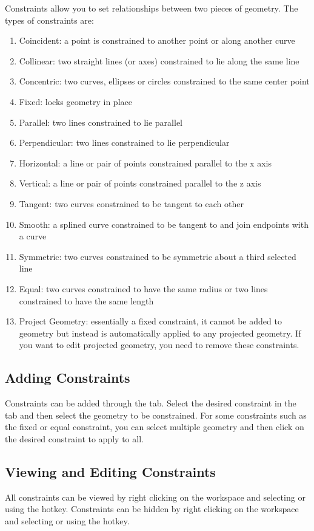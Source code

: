\cbstart

Constraints allow you to set relationships between two pieces of geometry. The types of constraints are:

\begin{enumerate}
\item Coincident: a point is constrained to another point or along another curve
\item Collinear: two straight lines (or axes) constrained to lie along the same line
\item Concentric: two curves, ellipses or circles constrained to the same center point
\item Fixed: locks geometry in place
\item Parallel: two lines constrained to lie parallel
\item Perpendicular: two lines constrained to lie perpendicular
\item Horizontal: a line or pair of points constrained parallel to the x axis
\item Vertical: a line or pair of points constrained parallel to the z axis
\item Tangent: two curves constrained to be tangent to each other
\item Smooth: a splined curve constrained to be tangent to and join endpoints with a curve
\item Symmetric: two curves constrained to be symmetric about a third selected line
\item Equal: two curves constrained to have the same radius or two lines constrained to have the same length
\item Project Geometry: essentially a fixed constraint, it cannot be added to geometry but instead is automatically applied to any projected geometry. If you want to edit projected geometry, you need to remove these constraints.
\end{enumerate}

\cbend

\subsection{Adding Constraints}
\cbstart
Constraints can be added through the  tab. Select the desired constraint in the tab and then select the geometry to be constrained. For some constraints such as the fixed or equal constraint, you can select multiple geometry and then click on the desired constraint to apply to all.
\cbend
\subsection{Viewing and Editing Constraints}
\cbstart
All constraints can be viewed by right clicking on the workspace and selecting  or using the  hotkey. Constraints can be hidden by right clicking on the workspace and selecting  or using the  hotkey.


